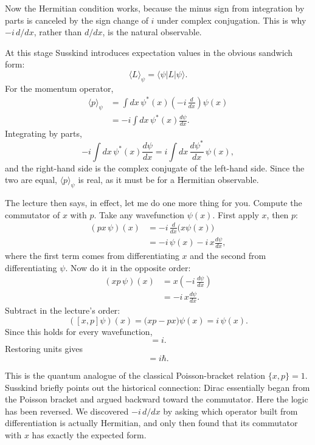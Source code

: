 Now the Hermitian condition works, because the minus sign from integration by parts is canceled by the sign change of \(i\) under complex conjugation. This is why \(-i\,d/dx\), rather than \(d/dx\), is the natural observable.

At this stage Susskind introduces expectation values in the obvious sandwich form:
\begin{equation}
\langle L\rangle_\psi=\langle \psi|L|\psi\rangle.
\end{equation}
For the momentum operator,
\begin{align}
\langle p\rangle_\psi
&=\int dx\,\psi^*(x)\left(-i\,\frac{d}{dx}\right)\psi(x) \\
&=-i\int dx\,\psi^*(x)\frac{d\psi}{dx}.
\end{align}
Integrating by parts,
\begin{equation}
-i\int dx\,\psi^*(x)\frac{d\psi}{dx}
=
i\int dx\,\frac{d\psi^*}{dx}\,\psi(x),
\end{equation}
and the right-hand side is the complex conjugate of the left-hand side. Since the two are equal, \(\langle p\rangle_\psi\) is real, as it must be for a Hermitian observable.

The lecture then says, in effect, let me do one more thing for you. Compute the commutator of \(x\) with \(p\). Take any wavefunction \(\psi(x)\). First apply \(x\), then \(p\):
\begin{align}
(px\,\psi)(x)
&=-i\,\frac{d}{dx}\bigl(x\psi(x)\bigr) \\
&=-i\,\psi(x)-i\,x\frac{d\psi}{dx},
\end{align}
where the first term comes from differentiating \(x\) and the second from differentiating \(\psi\). Now do it in the opposite order:
\begin{align}
(xp\,\psi)(x)
&=x\left(-i\,\frac{d\psi}{dx}\right) \\
&=-i\,x\frac{d\psi}{dx}.
\end{align}
Subtract in the lecture's order:
\begin{equation}
([x,p]\psi)(x)=\bigl(xp-px\bigr)\psi(x)=i\,\psi(x).
\end{equation}
Since this holds for every wavefunction,
\begin{equation}
[x,p]=i.
\end{equation}
Restoring units gives
\begin{equation}
[x,p]=i\hbar.
\end{equation}

This is the quantum analogue of the classical Poisson-bracket relation \(\{x,p\}=1\). Susskind briefly points out the historical connection: Dirac essentially began from the Poisson bracket and argued backward toward the commutator. Here the logic has been reversed. We discovered \(-i\,d/dx\) by asking which operator built from differentiation is actually Hermitian, and only then found that its commutator with \(x\) has exactly the expected form.

